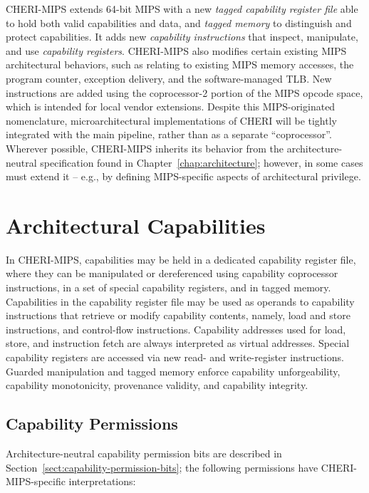 CHERI-MIPS extends 64-bit MIPS with a new \textit{tagged capability register
file} able to hold both valid capabilities and data, and \textit{tagged
  memory}
to distinguish and protect capabilities.  It
adds new \textit{capability instructions} that inspect, manipulate, and
use \textit{capability registers}.
CHERI-MIPS also modifies certain existing MIPS architectural behaviors, such
as relating to existing MIPS memory accesses, the program counter, exception
delivery, and the software-managed TLB.
New instructions are added using the coprocessor-2 portion of the MIPS opcode
space, which is intended for local vendor extensions.
Despite this MIPS-originated nomenclature, microarchitectural implementations
of CHERI will be tightly integrated with the main pipeline, rather than as a
separate ``coprocessor''.
Wherever possible, CHERI-MIPS inherits its behavior from the
architecture-neutral specification found in Chapter~\ref{chap:architecture};
however, in some cases must extend it -- e.g., by defining MIPS-specific aspects of
architectural privilege.

\section{Architectural Capabilities}

In CHERI-MIPS, capabilities may be held in a dedicated capability register
file, where they can be manipulated or dereferenced using capability
coprocessor instructions, in a set of special capability registers, and in
tagged memory.
Capabilities in the capability register file may be used as operands to
capability instructions that retrieve or modify capability contents, namely,
load and store instructions, and control-flow instructions.
Capability addresses used for load, store, and instruction fetch are always
interpreted as virtual addresses.
Special capability registers are accessed via new read- and write-register
instructions.
Guarded manipulation and tagged memory enforce capability unforgeability,
capability monotonicity, provenance validity, and capability integrity.

\subsection{Capability Permissions}

Architecture-neutral capability permission bits are described in
Section~\ref{sect:capability-permission-bits}; the following permissions
have CHERI-MIPS-specific interpretations:

